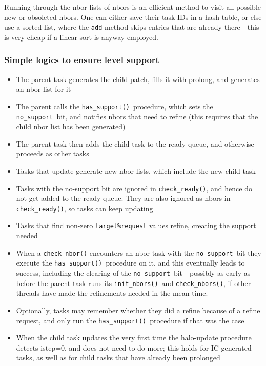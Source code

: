 \documentclass[paper=a4,fontsize=11pt]{scrartcl}
\numberwithin{equation}{section}		%
\numberwithin{figure}{section}			%
\numberwithin{table}{section}				%
\newcommand{\codecolor}{\color{Blue}}
\newcommand{\Code}[1]{{\codecolor\texttt{#1}}}
\def\hassupport{\Code{has\_support()}}
\def\nosupport{\Code{no\_support}}
\def\checkready{\Code{check\_ready()}}
\def\checknbors{\Code{check\_nbors()}}
\def\initnbors{\Code{init\_nbors()}}
\begin{document}
Running through the nbor lists of nbors is an efficient method to visit all possible new or obsoleted nbors.   One can either save their task IDs in a hash table, or else use a sorted list, where the \Code{add} method skips entries that are already there---this is very cheap if a linear sort is anyway employed.

\subsubsection{Simple logics to ensure level support}
\begin{itemize}
    \item The parent task generates the child patch, fills it with prolong, and generates an nbor list for it

    \item The parent calls the \hassupport\ procedure, which sets the \nosupport\ bit, and notifies nbors that need to refine (this requires that the child nbor list has been generated)

    \item The parent task then adds the child task to the ready queue, and otherwise proceeds as other tasks

    \item Tasks that update generate new nbor lists, which include the new child task

    \item Tasks with the no-support bit are ignored in \checkready, and hence do not get added to the ready-queue.  They are also ignored as nbors in \checkready, so tasks can keep updating

    
    \item Tasks that find non-zero \Code{target\%request} values refine, creating the support needed
    
    \item When a \Code{check\_nbor()} encounters an nbor-task with the \nosupport\ bit they execute the \hassupport\ procedure on it, and this eventually leads to success, including the clearing of the \nosupport\ bit---possibly as early as before the parent task runs its \initnbors\ and  \checknbors, if other threads have made the refinements needed in the mean time.   
    
    \item Optionally, tasks may remember whether they did a refine because of a refine request, and only run the \hassupport\ procedure if that was the case
    
    \item When the child task updates the very first time the halo-update procedure detects istep=0, and does not need to do more; this holds for IC-generated tasks, as well as for child tasks that have already been prolonged
    
\end{itemize}
\end{document}
